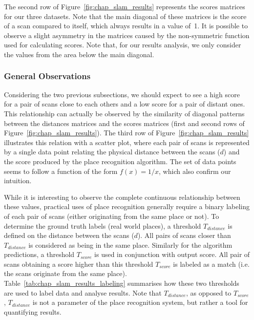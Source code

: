 The second row of Figure~\ref{fig:chap_slam_results} represents the scores matrices for our three datasets. Note that the main diagonal of these matrices is the score of a scan compared to itself, which always results in a value of~1. It is possible to observe a slight asymmetry in the matrices caused by the non-symmetric function used for calculating scores. Note that, for our results analysis, we only consider the values from the area below the main diagonal.


\subsubsection{General Observations}
\label{ssec:chap_slam_results_evaluation}

Considering the two previous subsections, we should expect to see a high score for a pair of scans close to each others and a low score for a pair of distant ones. This relationship can actually be observed by the similarity of diagonal patterns between the distances matrices and the scores matrices (first and second rows of Figure~\ref{fig:chap_slam_results}). The third row of Figure~\ref{fig:chap_slam_results} illustrates this relation with a scatter plot, where each pair of scans is represented by a single data point relating the physical distance between the scans ($d$) and the score produced by the place recognition algorithm. The set of data points seems to follow a function of the form $f(x) = 1 / x$, which also confirm our intuition.

While it is interesting to observe the complete continuous relationship between these values, practical uses of place recognition generally require a binary labeling of each pair of scans (either originating from the same place or not). To determine the ground truth labels (real world places), a threshold $T_{distance}$ is defined on the distance between the scans ($d$). All pairs of scans closer than $T_{distance}$ is considered as being in the same place. Similarly for the algorithm predictions, a threshold $T_{score}$ is used in conjunction with output score. All pair of scans obtaining a score higher than this threshold $T_{score}$ is labeled as a match (i.e. the scans originate from the same place). Table~\ref{tab:chap_slam_results_labeling} summarises how these two thresholds are used to label data and analyse results. Note that $T_{distance}$, as opposed to $T_{score}$, $T_{distance}$ is not a parameter of the place recognition system, but rather a tool for quantifying results. 


